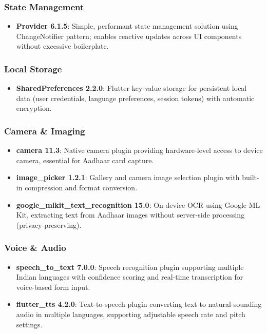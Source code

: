 \subsubsection{State Management}
\begin{itemize}
    \item \textbf{Provider 6.1.5}: Simple, performant state management solution using ChangeNotifier pattern; enables reactive updates across UI components without excessive boilerplate.
\end{itemize}

\subsubsection{Local Storage}
\begin{itemize}
    \item \textbf{SharedPreferences 2.2.0}: Flutter key-value storage for persistent local data (user credentials, language preferences, session tokens) with automatic encryption.
\end{itemize}

\subsubsection{Camera \& Imaging}
\begin{itemize}
    \item \textbf{camera 11.3}: Native camera plugin providing hardware-level access to device camera, essential for Aadhaar card capture.
    \item \textbf{image\_picker 1.2.1}: Gallery and camera image selection plugin with built-in compression and format conversion.
    \item \textbf{google\_mlkit\_text\_recognition 15.0}: On-device OCR using Google ML Kit, extracting text from Aadhaar images without server-side processing (privacy-preserving).
\end{itemize}

\subsubsection{Voice \& Audio}
\begin{itemize}
    \item \textbf{speech\_to\_text 7.0.0}: Speech recognition plugin supporting multiple Indian languages with confidence scoring and real-time transcription for voice-based form input.
    \item \textbf{flutter\_tts 4.2.0}: Text-to-speech plugin converting text to natural-sounding audio in multiple languages, supporting adjustable speech rate and pitch settings.
\end{itemize}

